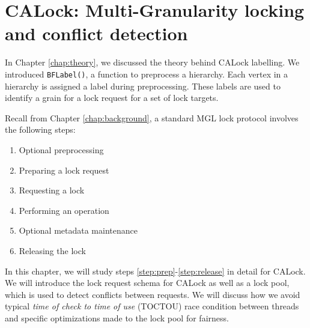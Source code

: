 
\chapter{CALock: Multi-Granularity locking and conflict detection} \label{chap:calock}

\minitoc

In Chapter \ref{chap:theory}, we discussed the theory behind CALock labelling. We introduced \lstinline|BFLabel()|, a function to preprocess a hierarchy. Each vertex in a hierarchy is assigned a label during preprocessing. These labels are used to identify a grain for a lock request for a set of lock targets. 


Recall from Chapter \ref{chap:background}, a standard MGL lock protocol involves the following steps:

\begin{enumerate}
	\item Optional preprocessing
	\item Preparing a lock request \label{step:prep}
	\item Requesting a lock
	\item Performing an operation
	\item Optional metadata maintenance
	\item Releasing the lock \label{step:release}
\end{enumerate}

In this chapter, we will study steps \ref{step:prep}-\ref{step:release} in detail for CALock. We will introduce the lock request schema for CALock as well as a lock pool, which is used to detect conflicts between requests. We will discuss how we avoid typical \emph{time of check to time of use} (TOCTOU) race condition between threads and specific optimizations made to the lock pool for fairness.



